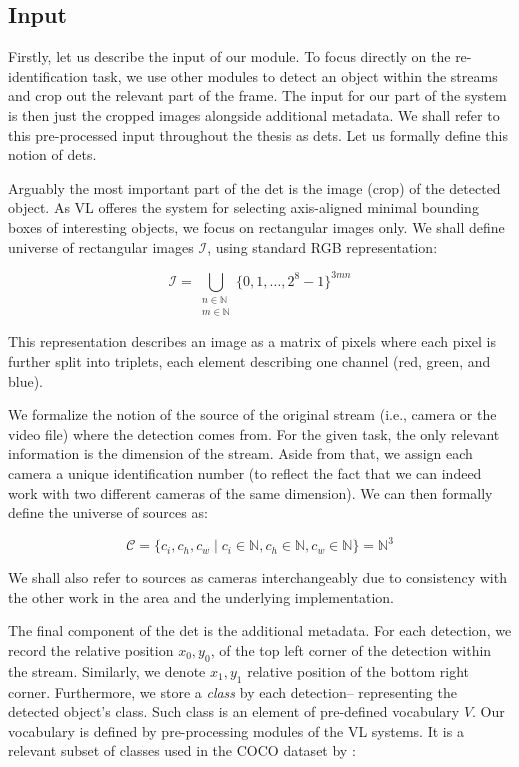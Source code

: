 \subsection{Input}

\label{ssec:input}

Firstly, let us describe the input of our module. To focus directly on the re-identification task, we use other modules to detect an object within the streams and crop out the relevant part of the frame. The input for our part of the system is then just the cropped images alongside additional metadata. We shall refer to this pre-processed input throughout the thesis as \glspl{det}. Let us formally define this notion of \glspl{det}.

Arguably the most important part of the \gls{det} is the image (crop) of the detected object. As \gls{VL} offeres the system for selecting axis-aligned minimal bounding boxes of interesting objects, we focus on rectangular images only. We shall define universe of rectangular images $\mathcal{I}$, using standard RGB representation:

\begin{equation}
\mathcal{I} = \bigcup_{\substack{n \in \mathbb{N} \\ m \in \mathbb{N}}} \{0, 1, \ldots, 2^8-1\}^{3mn}
\label{eq:image}
\end{equation}


This representation describes an image as a matrix of pixels where each pixel is further split into triplets, each element describing one channel (red, green, and blue).

We formalize the notion of the source of the original stream (i.e., camera or the video file) where the detection comes from. For the given task, the only relevant information is the dimension of the stream. Aside from that, we assign each camera a unique identification number (to reflect the fact that we can indeed work with two different cameras of the same dimension). We can then formally define the universe of sources as:

$$\mathcal{C} = \{c_i, c_h, c_w \mid c_i \in \mathbb{N}, c_h \in \mathbb{N}, c_w \in \mathbb{N}\}
 = \mathbb{N}^3$$
 
We shall also refer to sources as cameras interchangeably due to consistency with the other work in the area and the underlying implementation.

The final component of the \gls{det} is the additional metadata. For each detection, we record the relative position $x_0, y_0$, of the top left corner of the detection within the stream. Similarly, we denote $x_1, y_1$ relative position of the bottom right corner. Furthermore, we store a \emph{class} by each detection-- representing the detected object's class. Such class is an element of pre-defined vocabulary $V$. Our vocabulary is defined by pre-processing modules of the \gls{VL} systems. It is a relevant subset of classes used in the COCO dataset by \cite{cocodataset}:

